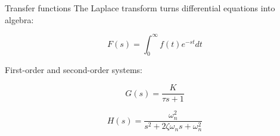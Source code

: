 \begin{frame}{Transfer functions}
The Laplace transform turns differential equations into algebra:

\[ F(s)=\int_{0}^{\infty} f(t)e^{-st}dt \]

First-order and second-order systems:

\[ G(s)=\frac{K}{\tau s+1} \]

\[ H(s)=\frac{{\omega}_n^2}{s^2+2\zeta {\omega}_ns+{\omega}_n^2} \]
\end{frame}
